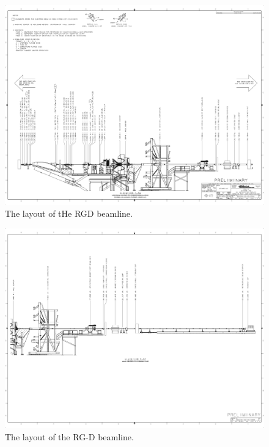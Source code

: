 \documentclass[11pt]{article}
\begin{document}
\begin{figure}[hbt]
\vspace{-2cm}
\begin{center}
\includegraphics[width=9in,angle=90]{RGD_beamline_p1.pdf}
\caption{ \label{fig:beamline1} The layout of tHe RGD beamline. }
\end{center}
\end{figure}

\begin{figure}[hbt]
\vspace{-2cm}
\begin{center}
\includegraphics[width=9in,angle=90]{RGD_beamline_p2.pdf}
\end{center}
\caption{ \label{fig:beamline2} 
The layout of the RG-D beamline. }
\end{figure}
\end{document}
